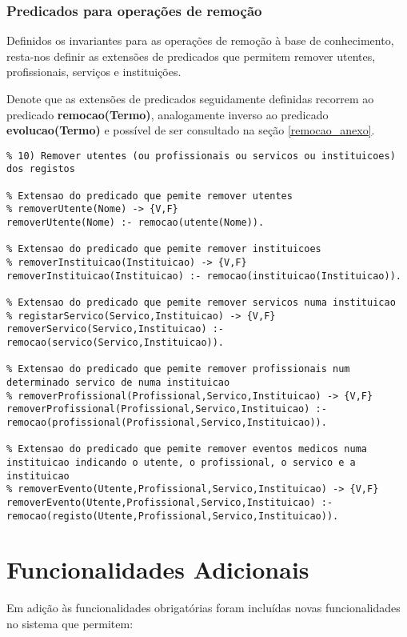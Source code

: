\documentclass[
  oneside,
  10pt, a4paper,
  footinclude=true,
  headinclude=true,
  cleardoublepage=empty
]{scrbook}
\begin{document}
\subsubsection{Predicados para operações de remoção}
Definidos os invariantes para as operações de remoção à base de conhecimento, resta-nos definir as extensões de predicados que permitem remover utentes, profissionais, serviços e instituições.\par
Denote que as extensões de predicados seguidamente definidas recorrem ao predicado \textbf{remocao(Termo)}, analogamente inverso ao predicado  \textbf{evolucao(Termo)} e possível de ser consultado na seção \ref{remocao_anexo}.

\begin{lstlisting}
% 10) Remover utentes (ou profissionais ou servicos ou instituicoes) dos registos

% Extensao do predicado que pemite remover utentes
% removerUtente(Nome) -> {V,F}
removerUtente(Nome) :- remocao(utente(Nome)).

% Extensao do predicado que pemite remover instituicoes
% removerInstituicao(Instituicao) -> {V,F}
removerInstituicao(Instituicao) :- remocao(instituicao(Instituicao)).

% Extensao do predicado que pemite remover servicos numa instituicao
% registarServico(Servico,Instituicao) -> {V,F}
removerServico(Servico,Instituicao) :- remocao(servico(Servico,Instituicao)).

% Extensao do predicado que pemite remover profissionais num determinado servico de numa instituicao
% removerProfissional(Profissional,Servico,Instituicao) -> {V,F}
removerProfissional(Profissional,Servico,Instituicao) :- remocao(profissional(Profissional,Servico,Instituicao)).

% Extensao do predicado que pemite remover eventos medicos numa instituicao indicando o utente, o profissional, o servico e a instituicao
% removerEvento(Utente,Profissional,Servico,Instituicao) -> {V,F}
removerEvento(Utente,Profissional,Servico,Instituicao) :- remocao(registo(Utente,Profissional,Servico,Instituicao)).
\end{lstlisting}



% 
%
%
%
%
%

\section{Funcionalidades Adicionais}
Em adição às funcionalidades obrigatórias foram incluídas novas funcionalidades no sistema que permitem:
\end{document}
